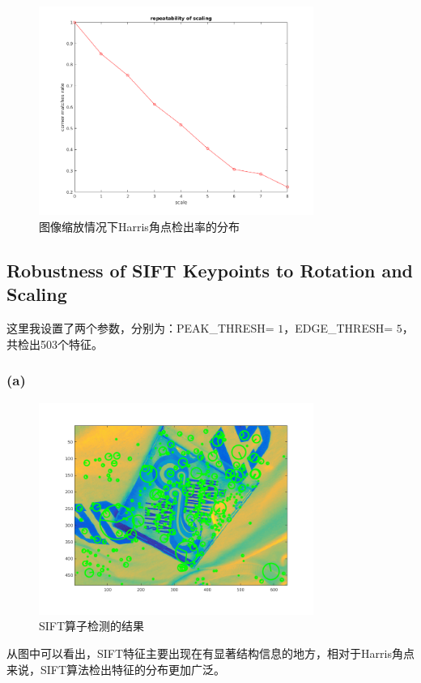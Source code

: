 \documentclass[a4paper, UTF8]{ctexrep}
\begin{document}
				\clearpage
				\begin{figure}[htbp!]
					\centering
					\includegraphics[width=0.8\textwidth]{hw1_fig8.png}
					\caption{图像缩放情况下Harris角点检出率的分布}
				\end{figure}

		\subsection{Robustness of SIFT Keypoints to Rotation and Scaling}
			这里我设置了两个参数，分别为：PEAK\_THRESH= $1$，EDGE\_THRESH= $5$，共检出503个特征。
			\clearpage
			\subsubsection{(a)}
				\begin{figure}[htbp!]
					\centering
					\includegraphics[width=0.8\textwidth]{hw1_fig9.png}
					\caption{SIFT算子检测的结果}
				\end{figure}
				从图中可以看出，SIFT特征主要出现在有显著结构信息的地方，相对于Harris角点来说，SIFT算法检出特征的分布更加广泛。
			\clearpage
\end{document}
